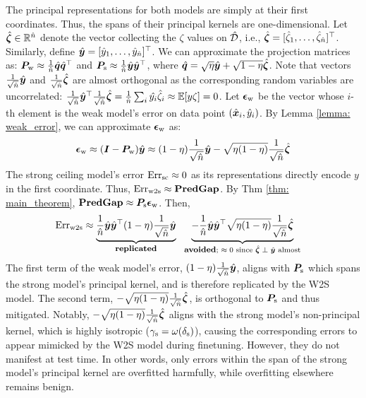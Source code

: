 The principal representations for both models are simply at their first coordinates. Thus, the spans of their principal kernels are one-dimensional.  Let $\hat{{\bm{\zeta}}} \in {\mathbb{R}}^{\hat{n}}$ denote the vector collecting the $\zeta$ values on $\hat{{\mathcal{D}}}$, i.e., $\hat{{\bm{\zeta}}} = [\hat{\zeta}_1, \dots, \hat{\zeta}_{\hat{n}}]^\top$. Similarly, define $\hat{{\bm{y}}} = [\hat{y}_1, \dots, \hat{y}_{\hat{n}}]^\top$. We can approximate the projection matrices as: 
${\bm{P}}_{\text{w}}  \approx \frac{1}{\hat{n}}\hat{{\bm{q}}}\hat{{\bm{q}}}^\top$ and $
    {\bm{P}}_{\text{s}} \approx    
 \frac{1}{\hat{n}}\hat{{\bm{y}}}\hat{{\bm{y}}}^\top$, where $\hat{{\bm{q}}}=\sqrt{\eta}\hat{{\bm{y}}} + \sqrt{1-\eta}\hat{{\bm{\zeta}}}$.
Note that vectors $\frac{1}{\sqrt{\hat{n}}}\hat{{\bm{y}}}$ and $\frac{1}{\sqrt{\hat{n}}}\hat{{\bm{\zeta}}}$ are almost orthogonal as the corresponding random variables are uncorrelated: $
    \frac{1}{\sqrt{\hat{n}}}\hat{{\bm{y}}}^\top \frac{1}{\sqrt{\hat{n}}}\hat{{\bm{\zeta}}} = \frac{1}{\hat{n}}\sum_{i}\hat{y_i}\hat{\zeta}_i\approx\mathbb{E} [y\zeta]=0$. Let ${\bm{\epsilon}}_{\text{w}}$ be the vector whose $i$-th element is the weak model's error on data point $(\hat{{\bm{x}}}_i, \hat{y}_i)$. By Lemma \ref{lemma: weak_error}, we can approximate  ${\bm{\epsilon}}_{\text{w}}$ as: 
$$
    {\bm{\epsilon}}_{\text{w}} \approx ({\bm{I}} - {\bm{P}}_{\text{w}})\hat{{\bm{y}}} \approx  (1-\eta)\frac{1}{\sqrt{\hat{n}}}\hat{{\bm{y}}}  - \sqrt{\eta(1-\eta)}\frac{1}{\sqrt{\hat{n}}}\hat{{\bm{\zeta}}}
$$
The strong ceiling model's error $\text{Err}_{\text{sc}} \approx 0$ as its representations directly encode $y$ in the first coordinate. Thus, $\text{Err}_{\text{w2s}} \approx \textbf{PredGap}{}$. By Thm \ref{thm: main_theorem}, $\textbf{PredGap}{}\approx {\bm{P}}_{\text{s}} {\bm{\epsilon}}_{\text{w}}$. Then, 
\begin{align}
\nonumber
& \text{Err}_{\text{w2s}} \approx 
\underbrace{ \frac{1}{\hat{n}}\hat{{\bm{y}}}\hat{{\bm{y}}}^\top(1- \eta)\frac{1}{\sqrt{\hat{n}}}\hat{{\bm{y}}}}_{\textbf{\footnotesize replicated}} ~~\underbrace{  -\frac{1}{\hat{n}}\hat{{\bm{y}}}\hat{{\bm{y}}}^\top \sqrt{\eta(1-\eta)}\frac{1}{\sqrt{\hat{n}}}\hat{{\bm{\zeta}}} }_{\textbf{\footnotesize avoided} \text{; $\approx 0$ since $\hat{{\bm{\zeta}}}\perp \hat{{\bm{y}}}$ almost}}
\end{align}
The first term of the weak model's error, $(1 - \eta)\frac{1}{\sqrt{\hat{n}}}\hat{{\bm{y}}}$, aligns with ${\bm{P}}_{\text{s}}$ which spans the strong model's principal kernel, and is therefore replicated by the W2S model. The second term, $-\sqrt{\eta(1 - \eta)}\frac{1}{\sqrt{\hat{n}}}\hat{{\bm{\zeta}}}$, is orthogonal to ${\bm{P}}_{\text{s}}$ and thus mitigated. Notably, $-\sqrt{\eta(1 - \eta)}\frac{1}{\sqrt{\hat{n}}}\hat{{\bm{\zeta}}}$ aligns with the strong model's non-principal kernel, which is highly isotropic ($\gamma_{\text{s}} = \omega(\delta_{\text{s}})$), causing the corresponding errors to appear mimicked by the W2S model during finetuning. However, they do not manifest at test time. In other words, only errors within the span of the strong model's principal kernel are overfitted harmfully, while overfitting elsewhere remains benign. 



